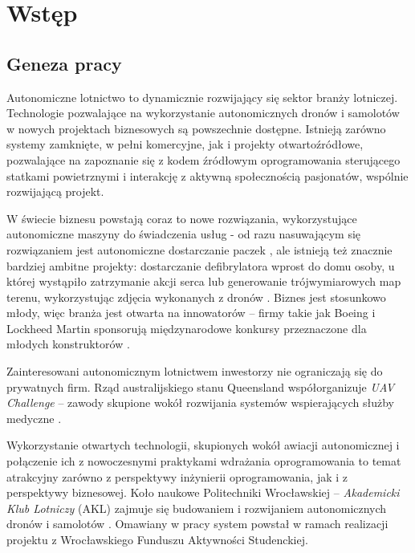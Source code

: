 \chapter{Wstęp}


\section{Geneza pracy} \label{intro_genesis}

Autonomiczne lotnictwo to dynamicznie rozwijający się sektor branży lotniczej.
Technologie pozwalające na wykorzystanie autonomicznych dronów i samolotów
w nowych projektach biznesowych są powszechnie dostępne. Istnieją
zarówno systemy zamknięte, w pełni komercyjne, jak i projekty otwartoźródłowe,
pozwalające na zapoznanie się z kodem źródłowym oprogramowania sterującego statkami
powietrznymi i interakcję z aktywną społecznością pasjonatów, wspólnie rozwijającą
projekt. 

W świecie biznesu powstają coraz to nowe rozwiązania, wykorzystujące autonomiczne
maszyny do świadczenia usług - od razu nasuwającym się rozwiązaniem
jest autonomiczne dostarczanie paczek \cite{prime_air}, ale istnieją też znacznie
bardziej ambitne projekty: dostarczanie defibrylatora wprost do domu osoby, u której
wystąpiło zatrzymanie akcji serca \cite{10.1001/jama.2017.3957} lub generowanie
trójwymiarowych map terenu, wykorzystując zdjęcia wykonanych z dronów
\cite{uav_photogrametry}. Biznes jest stosunkowo młody, więc branża jest otwarta
na innowatorów -- firmy takie jak Boeing i Lockheed Martin sponsorują międzynarodowe
konkursy przeznaczone dla młodych konstruktorów \cite{sae_2018}. 

Zainteresowani autonomicznym lotnictwem inwestorzy nie ograniczają się do
prywatnych firm. Rząd australijskiego stanu Queensland współorganizuje
\textit{UAV Challenge} -- zawody skupione wokół rozwijania systemów wspierających 
służby medyczne \cite{uav_sponsors}.

Wykorzystanie otwartych technologii, skupionych wokół awiacji autonomicznej
i połączenie ich z nowoczesnymi praktykami wdrażania oprogramowania to temat atrakcyjny
zarówno z perspektywy inżynierii oprogramowania, jak i z perspektywy biznesowej. 
Koło naukowe Politechniki Wrocławskiej -- \textit{Akademicki Klub Lotniczy} (AKL) zajmuje
się budowaniem i rozwijaniem autonomicznych dronów i samolotów \cite{akl_home_page}.
Omawiany w pracy system powstał w ramach realizacji projektu
z Wrocławskiego Funduszu Aktywności Studenckiej\cite{fast_webpage}.

